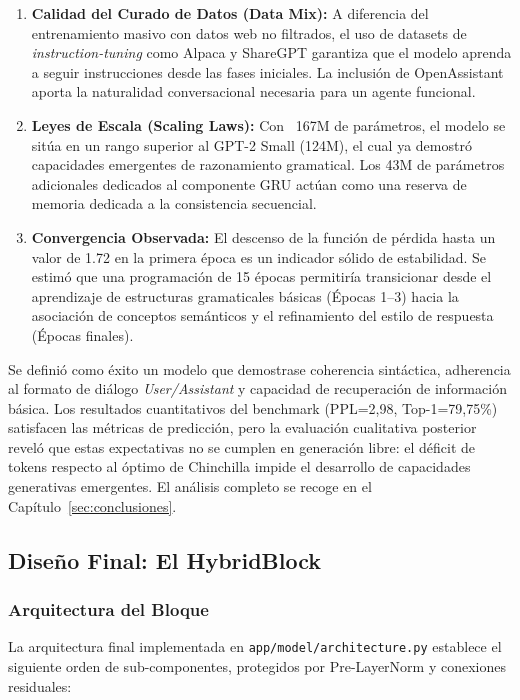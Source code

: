 \begin{enumerate}
    \item \textbf{Calidad del Curado de Datos (Data Mix):} A diferencia del entrenamiento masivo con datos web no filtrados, el uso de datasets de \textit{instruction-tuning} como Alpaca y ShareGPT garantiza que el modelo aprenda a seguir instrucciones desde las fases iniciales. La inclusión de OpenAssistant aporta la naturalidad conversacional necesaria para un agente funcional.
    \item \textbf{Leyes de Escala (Scaling Laws):} Con ~167M de parámetros, el modelo se sitúa en un rango superior al GPT-2 Small (124M), el cual ya demostró capacidades emergentes de razonamiento gramatical. Los 43M de parámetros adicionales dedicados al componente GRU actúan como una reserva de memoria dedicada a la consistencia secuencial.
    \item \textbf{Convergencia Observada:} El descenso de la función de pérdida hasta un valor de 1.72 en la primera época es un indicador sólido de estabilidad. Se estimó que una programación de 15 épocas permitiría transicionar desde el aprendizaje de estructuras gramaticales básicas (Épocas 1--3) hacia la asociación de conceptos semánticos y el refinamiento del estilo de respuesta (Épocas finales).
\end{enumerate}

Se definió como éxito un modelo que demostrase coherencia sintáctica, adherencia al formato de diálogo \textit{User/Assistant} y capacidad de recuperación de información básica. Los resultados cuantitativos del benchmark (PPL=2,98, Top-1=79,75\%) satisfacen las métricas de predicción, pero la evaluación cualitativa posterior reveló que estas expectativas no se cumplen en generación libre: el déficit de tokens respecto al óptimo de Chinchilla impide el desarrollo de capacidades generativas emergentes. El análisis completo se recoge en el Capítulo~\ref{sec:conclusiones}.

\subsection{Diseño Final: El HybridBlock}

\subsubsection{Arquitectura del Bloque}

La arquitectura final implementada en \texttt{app/model/architecture.py} establece el siguiente orden de sub-componentes, protegidos por Pre-LayerNorm y conexiones residuales:

